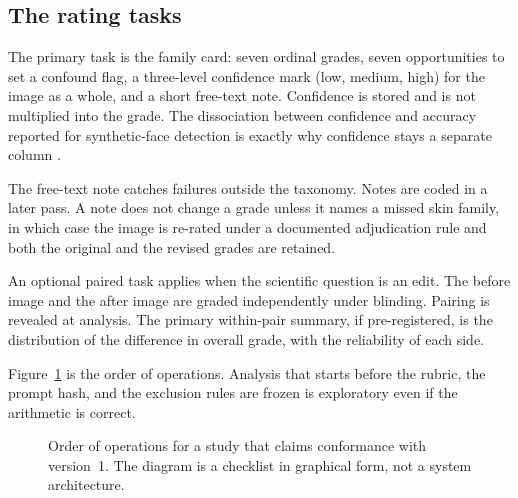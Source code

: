 \documentclass[10pt,twocolumn]{article}
\begin{document}
\subsection{The rating tasks}

The primary task is the family card: seven ordinal grades, seven opportunities to set a confound flag, a three-level confidence mark (low, medium, high) for the image as a whole, and a short free-text note. Confidence is stored and is not multiplied into the grade. The dissociation between confidence and accuracy reported for synthetic-face detection is exactly why confidence stays a separate column \cite{miller2023}.

The free-text note catches failures outside the taxonomy. Notes are coded in a later pass. A note does not change a grade unless it names a missed skin family, in which case the image is re-rated under a documented adjudication rule and both the original and the revised grades are retained.

An optional paired task applies when the scientific question is an edit. The before image and the after image are graded independently under blinding. Pairing is revealed at analysis. The primary within-pair summary, if pre-registered, is the distribution of the difference in overall grade, with the reliability of each side.

Figure~\ref{fig:flow} is the order of operations. Analysis that starts before the rubric, the prompt hash, and the exclusion rules are frozen is exploratory even if the arithmetic is correct.

\begin{figure}[t]
\centering
{}
\caption{Order of operations for a study that claims conformance with version~1. The diagram is a checklist in graphical form, not a system architecture.}
\label{fig:flow}
\end{figure}
\end{document}
